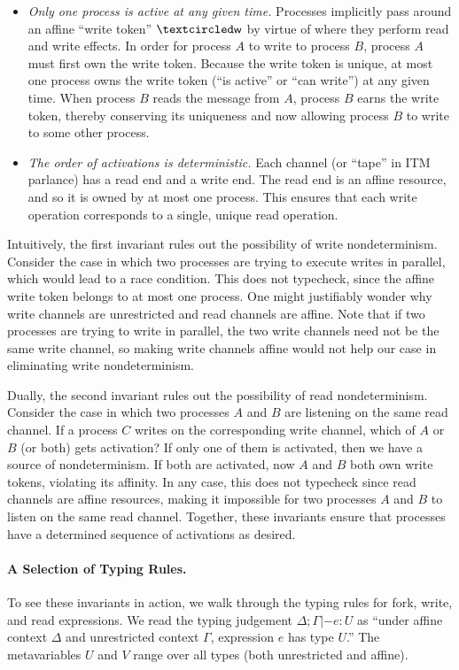 \begin{itemize}[leftmargin=*]
\item \emph{Only one process is active at any given time.} Processes implicitly
  pass around an affine ``write token'' $\wrtok$ by virtue of where they perform
  read and write effects. In order for process $A$ to write to process $B$,
  process $A$ must first own the write token.  Because the write token is
  unique, at most one process owns the write token (``is active'' or ``can
  write'') at any given time. When process $B$ reads the message from $A$, process
  $B$ earns the write token, thereby conserving its uniqueness and now allowing
  process $B$ to write to some other process.
  
\item \emph{The order of activations is deterministic.} Each channel (or
  ``tape'' in ITM parlance) has a read end and a write end. The read end is an
  affine resource, and so it is owned by at most one process. This ensures that
  each write operation corresponds to a single, unique read operation.
\end{itemize}

Intuitively, the first invariant rules out the possibility of write
nondeterminism. Consider the case in which two processes are trying to execute
writes in parallel, which would lead to a race condition. This does not
typecheck, since the affine write token belongs to at most one process. One
might justifiably wonder why write channels are unrestricted and read channels
are affine. Note that if two processes are trying to write in parallel, the two
write channels need not be the same write channel, so making write channels
affine would not help our case in eliminating write nondeterminism.

Dually, the second invariant rules out the possibility of read
nondeterminism. Consider the case in which two processes $A$ and $B$ are
listening on the same read channel. If a process $C$ writes on the corresponding
write channel, which of $A$ or $B$ (or both) gets activation? If only one of
them is activated, then we have a source of nondeterminism. If both are
activated, now $A$ and $B$ both own write tokens, violating its affinity. In any
case, this does not typecheck since read channels are affine resources, making
it impossible for two processes $A$ and $B$ to listen on the same read
channel. Together, these invariants ensure that processes have a determined
sequence of activations as desired.

\paragraph{A Selection of Typing Rules.} To see these invariants in action, we walk through the typing rules for fork,
write, and read expressions. We read the typing judgement $\Delta ; \Gamma |- e : U$ as
``under affine context $\Delta$ and unrestricted context $\Gamma$, expression $e$ has
type $U$.'' The metavariables $U$ and $V$ range over all types (both
unrestricted and affine).

